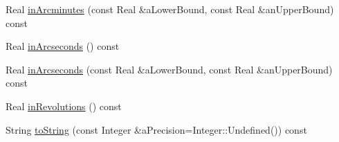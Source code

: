 \begin{DoxyCompactItemize}
\item 
Real \hyperlink{classlibrary_1_1math_1_1geom_1_1_angle_ab6c337dacd75f1bc5c49df77780833c1}{in\+Arcminutes} (const Real \&a\+Lower\+Bound, const Real \&an\+Upper\+Bound) const
\item 
Real \hyperlink{classlibrary_1_1math_1_1geom_1_1_angle_a2d285ab36453ff13c86689d799e97aa6}{in\+Arcseconds} () const
\item 
Real \hyperlink{classlibrary_1_1math_1_1geom_1_1_angle_a2118034e9248ed58f741241d4c02903c}{in\+Arcseconds} (const Real \&a\+Lower\+Bound, const Real \&an\+Upper\+Bound) const
\item 
Real \hyperlink{classlibrary_1_1math_1_1geom_1_1_angle_a5d7b4b12cc0019dec88ddb95c3d1be79}{in\+Revolutions} () const
\item 
String \hyperlink{classlibrary_1_1math_1_1geom_1_1_angle_af4feebe3517548c328808fb36403996d}{to\+String} (const Integer \&a\+Precision=Integer\+::\+Undefined()) const
\end{DoxyCompactItemize}
